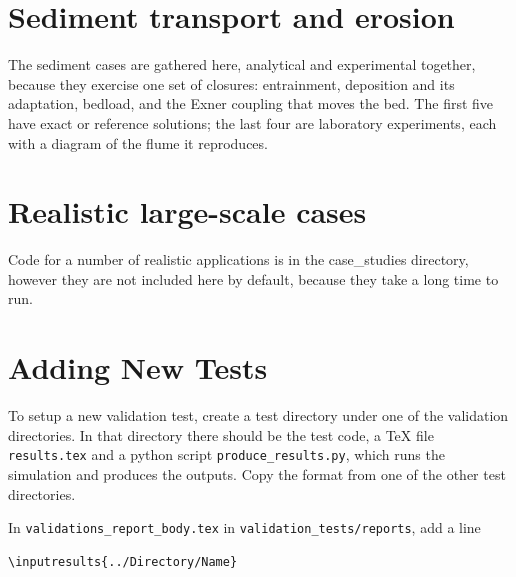\chapter{Sediment transport and erosion} \label{ch:sediment}

The sediment cases are gathered here, analytical and experimental together,
because they exercise one set of closures: entrainment, deposition and its
adaptation, bedload, and the Exner coupling that moves the bed. The first
five have exact or reference solutions; the last four are laboratory
experiments, each with a diagram of the flume it reproduces.



\chapter{Realistic large-scale cases} \label{ch:casestudy}
Code for a number of realistic applications is in the case\_studies directory,
however they are not included here by default, because they take a long time to
run.

\appendix
\chapter{Adding New Tests}


To setup a new validation test, create a test directory under one of
the validation directories. In that directory there should be the test code, a
\TeX{} file \texttt{results.tex} and a python script
\texttt{produce\_results.py}, which runs the simulation and produces the
outputs. Copy the format from one of the other test directories.

In \texttt{validations\_report\_body.tex} in \texttt{validation\_tests/reports}, add a line
\begin{verbatim}
\inputresults{../Directory/Name}
\end{verbatim}



